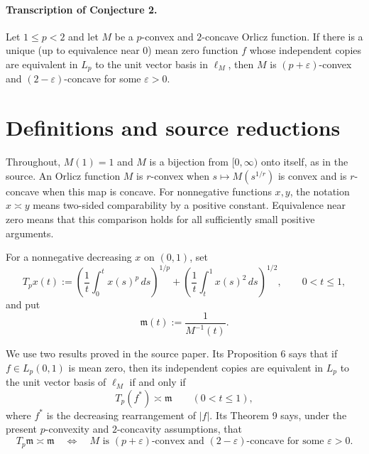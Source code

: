 \documentclass[11pt]{article}
\theoremstyle{definition}
\theoremstyle{remark}
\newcommand{\Tp}{T_p}
\newcommand{\mfun}{\mathfrak m}
\newcommand{\asympc}{\mathrel{\asymp}}
\newcommand{\Lp}{L_p(0,1)}
\begin{document}
\paragraph{Transcription of Conjecture 2.}
Let $1\leq p<2$ and let $M$ be a $p$-convex and $2$-concave Orlicz function.
If there is a unique (up to equivalence near $0$) mean zero function $f$ whose
independent copies are equivalent in $L_p$ to the unit vector basis in
$\ell_M$, then $M$ is $(p+\varepsilon)$-convex and
$(2-\varepsilon)$-concave for some $\varepsilon>0$.

\section{Definitions and source reductions}

Throughout, $M(1)=1$ and $M$ is a bijection from $[0,\infty)$ onto itself, as
in the source.  An Orlicz function $M$ is $r$-convex when
$s\mapsto M(s^{1/r})$ is convex and is $r$-concave when this map is concave.
For nonnegative functions $x,y$, the notation $x\asympc y$ means two-sided
comparability by a positive constant.  Equivalence near zero means that this
comparison holds for all sufficiently small positive arguments.

For a nonnegative decreasing $x$ on $(0,1)$, set
\begin{equation}\label{eq:T}
  \Tp x(t)
  :=
  \left(\frac1t\int_0^t x(s)^p\,ds\right)^{1/p}
  +
  \left(\frac1t\int_t^1 x(s)^2\,ds\right)^{1/2},
  \qquad 0<t\leq1,
\end{equation}
and put
\begin{equation}\label{eq:m}
  \mfun(t):=\frac1{M^{-1}(t)}.
\end{equation}

We use two results proved in the source paper.  Its Proposition 6 says that if
$f\in\Lp$ is mean zero, then its independent copies are equivalent in $L_p$
to the unit vector basis of $\ell_M$ if and only if
\begin{equation}\label{eq:source-criterion}
  \Tp(f^*)\asympc\mfun\qquad(0<t\leq1),
\end{equation}
where $f^*$ is the decreasing rearrangement of $|f|$.  Its Theorem 9 says,
under the present $p$-convexity and $2$-concavity assumptions, that
\begin{equation}\label{eq:source-strict}
  \Tp\mfun\asympc\mfun
  \quad\Longleftrightarrow\quad
  M\text{ is }(p+\varepsilon)\text{-convex and }
  (2-\varepsilon)\text{-concave for some }\varepsilon>0.
\end{equation}
\end{document}
